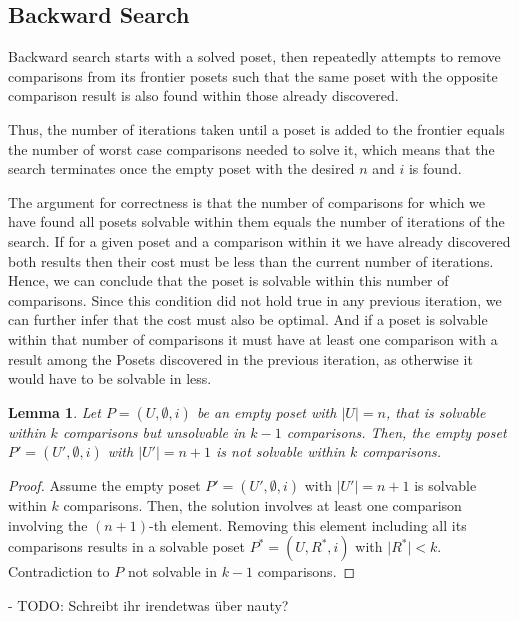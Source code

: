 \documentclass[10pt,journal,compsoc]{IEEEtran}
\newtheorem{lemma}{Lemma}
\begin{document}
\subsection{Backward Search}

Backward search starts with a solved poset, then repeatedly attempts to remove comparisons from its
frontier posets such that the same poset with the opposite comparison result is also found within
those already discovered.

Thus, the number of iterations taken until a poset is added to the frontier equals the number of
worst case comparisons needed to solve it, which means that the search terminates once the empty
poset with the desired $n$ and $i$ is found.

The argument for correctness is that the number of comparisons for which we have found all posets solvable within them equals the number of iterations of the search.
If for a given poset and a comparison within it we have already discovered both results then their cost must be less than the current number of iterations. Hence, we can conclude that the poset is solvable within this number of comparisons.
Since this condition did not hold true in any previous iteration, we can further infer that the cost must also be optimal.
And if a poset is solvable within
that number of comparisons it must have at least one comparison with a result among the Posets
discovered in the previous iteration, as otherwise it would have to be solvable in less.

\begin{lemma}
  Let $P=(U,\emptyset,i)$ be an empty poset with $\vert U \vert = n$, that is solvable within $k$ comparisons but unsolvable in $k-1$ comparisons.
  Then, the empty poset $P'=(U',\emptyset,i)$ with $\vert U'\vert = n+1$ is not solvable within $k$ comparisons.
\end{lemma}
\begin{proof}
  Assume the empty poset $P'=(U',\emptyset,i)$ with $\vert U' \vert = n+1$ is solvable within $k$ comparisons. Then, the solution involves at least one comparison involving the $(n+1)$-th element. Removing this element including all its comparisons results in a solvable poset $P^{*}=(U,R^{*},i)$ with $\vert R^{*}\vert < k$. Contradiction to $P$ not solvable in $k-1$ comparisons.
\end{proof}
- TODO: Schreibt ihr irendetwas über nauty?
\end{document}
